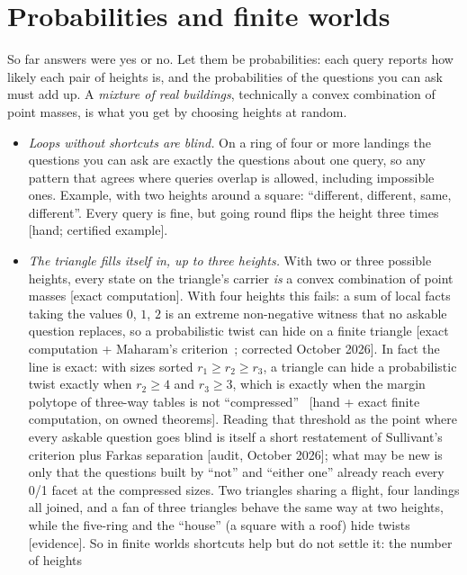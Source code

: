\documentclass[11pt]{article}
\newcommand{\st}[1]{\textsf{\small[#1]}}
\begin{document}
\section{Probabilities and finite worlds}\label{sec:finite}
So far answers were yes or no. Let them be probabilities: each query reports
how likely each pair of heights is, and the probabilities of the questions you
can ask must add up. A \emph{mixture of real buildings}, technically a convex
combination of point masses, is what you get by choosing heights at random.
\begin{itemize}[nosep]
  \item \emph{Loops without shortcuts are blind.} On a ring of four or more
    landings the questions you can ask are exactly the questions about one
    query, so any pattern that agrees where queries overlap is allowed, including
    impossible ones. Example, with two heights around a square: ``different,
    different, same, different''. Every query is fine, but going round flips the
    height three times \st{hand; certified example}.
  \item \emph{The triangle fills itself in, up to three heights.} With two or
    three possible heights, every state on the triangle's carrier \emph{is} a convex
    combination of point masses \st{exact computation}. With four heights
    this fails: a sum of local facts taking the values $0$, $1$, $2$ is an extreme
    non-negative witness that no askable question replaces, so a probabilistic
    twist can hide on a finite triangle \st{exact computation + Maharam's
    criterion~\cite{maharam1972}; corrected October 2026}. In fact the line is
    exact: with sizes sorted $r_1\ge r_2\ge r_3$, a triangle can hide a probabilistic
    twist exactly when $r_2\ge4$ and $r_3\ge3$, which is exactly when the margin
    polytope of three-way tables is not ``compressed''~\cite{sullivant2006,ohsugihibi2010}
    \st{hand + exact finite computation, on owned theorems}. Reading that threshold as the point where every askable question goes blind is
    itself a short restatement of Sullivant's criterion plus Farkas separation
    \st{audit, October 2026}; what may be new is only that the questions built by
    ``not'' and ``either one'' already reach every 0/1 facet at the compressed sizes. Two triangles sharing a flight,
    four landings all joined, and a fan of three triangles behave the same way
    at two heights, while the five-ring and the ``house'' (a square with a roof)
    hide twists \st{evidence}. So in finite worlds shortcuts help but do not settle it: the number of heights

\end{itemize}
\end{document}
